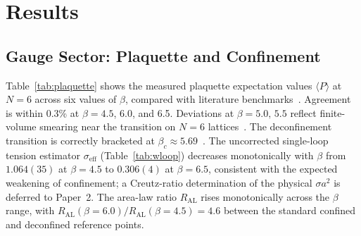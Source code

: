 \documentclass[12pt]{article}
\begin{document}
\section{Results}
\label{sec:results}

\subsection{Gauge Sector: Plaquette and Confinement}
\label{sec:plaquette}

Table~\ref{tab:plaquette} shows the measured plaquette expectation
values $\langle P\rangle$ at $N=6$ across six values of $\beta$,
compared with literature benchmarks~\cite{Creutz1980}.
Agreement is within 0.3\% at $\beta=4.5$, 6.0, and 6.5.
Deviations at $\beta=5.0,\,5.5$ reflect finite-volume smearing near
the transition on $N=6$ lattices~\cite{Iwasaki1983,Fukugita1989}.
The deconfinement transition is correctly bracketed at
$\beta_c\approx5.69$~\cite{Celik1983}.  The uncorrected single-loop tension estimator $\sigma_{\text{eff}}$
(Table~\ref{tab:wloop}) decreases monotonically with $\beta$ from
$1.064(35)$ at $\beta=4.5$ to $0.306(4)$ at $\beta=6.5$, consistent with
the expected weakening of confinement; a Creutz-ratio determination of
the physical $\sigma a^2$ is deferred to Paper~2.  The area-law
ratio $R_{\text{AL}}$ rises monotonically across the $\beta$ range,
with $R_{\text{AL}}(\beta=6.0)/R_{\text{AL}}(\beta=4.5)=4.6$ between the
standard confined and deconfined reference points.
\end{document}
